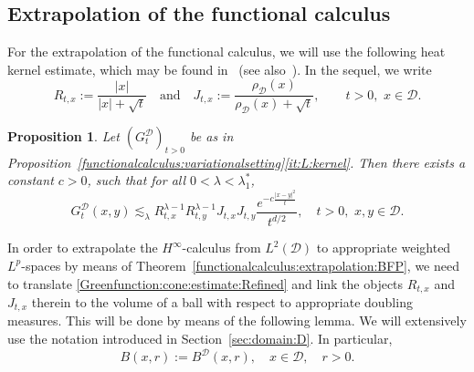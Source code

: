 \documentclass[12pt,a4paper, reqno]{amsart}
\theoremstyle{plain}
\newtheorem{proposition}[theorem]{Proposition}
\theoremstyle{definition}
\theoremstyle{remark}
\numberwithin{equation}{section}
\newcommand{\1}{\mathbbm{1}}
\newcommand{\calD}{\ensuremath{\mathcal{D}}}
\begin{document}
\subsection{Extrapolation of the functional calculus}\label{sec:FunCalc:extrapolate}
For the extrapolation of the functional calculus, we will use the following  heat kernel estimate, which may be found in~\cite[Theorem~2.1]{KimLeeSeoRefinedGreenCone} (see also~\cite{Carslaw1952ConductionOH,BanSmi1997}). 
In the sequel, we write
\[
    R_{t,x}:=\frac{|x|}{|x|+\sqrt{t}} \quad \text{and}\quad J_{t,x}:=\frac{\rho_\calD(x)}{\rho_\calD(x)+\sqrt{t}}, \qquad t>0,\,\, x\in\calD.
\] 
    \begin{proposition}
     Let $(G_t^\calD)_{t>0}$ be as in Proposition~\ref{functionalcalculus:variationalsetting}\ref{it:L:kernel}. 
     Then there exists a constant $c>0$, such that for all $ 0<\lambda<\lambda_1^*$,     \begin{equation}\label{Greenfunction:cone:estimate:Refined}
        G_t^\calD(x,y) \lesssim_{\lambda} R_{t,x}^{\lambda-1}R_{t,y}^{\lambda-1}J_{t,x}J_{t,y} \frac{e^{-c\frac{|x-y|^2}{t}}}{t^{d/2}}, \quad t>0,\,\,x,y\in\calD.
    \end{equation}    
 \end{proposition}

In order to  extrapolate the $H^\infty$-calculus from $L^2(\calD)$ to appropriate weighted $L^p$-spaces by means of Theorem~\ref{functionalcalculus:extrapolation:BFP}, we need to translate \eqref{Greenfunction:cone:estimate:Refined} and link the objects $R_{t,x}$ and $J_{t,x}$ therein to the volume of a ball with respect to appropriate doubling measures. This will be done by means of the following lemma. 
We will extensively use the notation introduced in Section~\ref{sec:domain:D}.
In particular, 
\[
B(x,r):=B^\calD(x,r),\quad x\in\calD,\quad r>0.
\]
    
\end{document}
